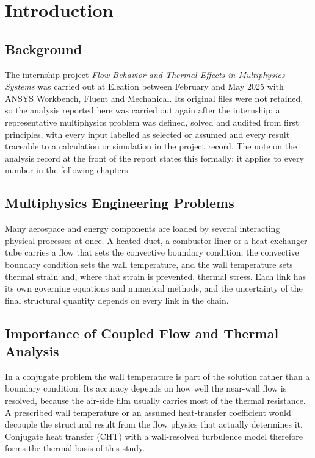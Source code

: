 \chapter{Introduction}\label{ch:intro}

\section{Background}
The internship project \emph{Flow Behavior and Thermal Effects in Multiphysics Systems} was carried out at Eleation between February and
May 2025 with ANSYS Workbench, Fluent and Mechanical. Its original files were not retained, so the analysis reported here was carried
out again after the internship: a representative multiphysics problem was defined, solved and audited from first principles, with every
input labelled as selected or assumed and every result traceable to a calculation or simulation in the project record. The note on the
analysis record at the front of the report states this formally; it applies to every number in the following chapters.

\section{Multiphysics Engineering Problems}
Many aerospace and energy components are loaded by several interacting physical processes at once. A heated duct, a combustor liner or
a heat-exchanger tube carries a flow that sets the convective boundary condition, the convective boundary condition sets the wall
temperature, and the wall temperature sets thermal strain and, where that strain is prevented, thermal stress. Each link has its own
governing equations and numerical methods, and the uncertainty of the final structural quantity depends on every link in the chain.

\section{Importance of Coupled Flow and Thermal Analysis}
In a conjugate problem the wall temperature is part of the solution rather than a boundary condition. Its accuracy depends on how well
the near-wall flow is resolved, because the air-side film usually carries most of the thermal resistance. A prescribed wall temperature
or an assumed heat-transfer coefficient would decouple the structural result from the flow physics that actually determines it.
Conjugate heat transfer (CHT) with a wall-resolved turbulence model therefore forms the thermal basis of this study.

